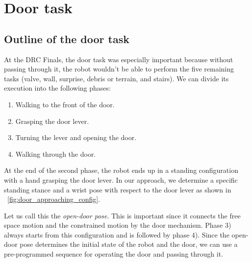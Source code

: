\section{Door task}
	\label{sub:door}

\subsection{Outline of the door task}
\label{sub:OutlineDoor}
%
At the DRC Finals, the door task was especially important because without passing through it,
the robot wouldn't be able to perform the five remaining tasks
(valve, wall, surprise, debris or terrain, and stairs).
We can divide its execution into the following phases:
%
\begin{enumerate}
	\item Walking to the front of the door.
	\item Grasping the door lever.
	\item Turning the lever and opening the door.
	\item Walking through the door.
\end{enumerate}
%

%

At the end of the second phase, the robot ends up in a standing configuration with a hand grasping
the door lever.
In our approach, we determine a specific standing stance and a wrist pose with respect to 
the door lever as shown in \figurename~\ref{fig:door_approaching_config}.

Let us call this the {\it open-door pose}.
This is important since it connects the free space motion and the constrained motion by
the door mechanism. 
Phase 3) always starts from this configuration and is followed by phase 4).
Since the open-door pose determines the initial state of the robot and the door, 
we can use a pre-programmed sequence for operating the door and passing through it.

